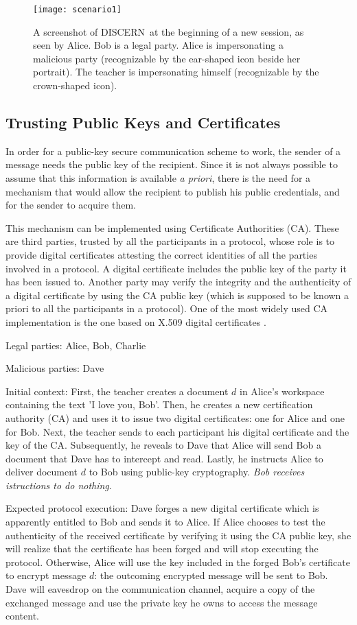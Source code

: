 \documentclass[conference]{IEEEtran}
\def\disgrace{DISCERN}
\begin{document}
\begin{figure*}
\centering
\texttt{[image: scenario1]}
\caption{A screenshot of \disgrace\ at the beginning of a new session, as seen by Alice. Bob is a legal party. Alice is impersonating a malicious party (recognizable by the ear-shaped icon beside her portrait). The teacher is impersonating himself (recognizable by the crown-shaped icon).}
\label{fig:scenario}
\end{figure*}

\subsection{ Trusting Public Keys and Certificates}
In order for a public-key secure communication scheme to work,
the sender of a message needs the public key of the recipient.
Since it is not always possible to assume that this information
is available {\em a priori}, there is the need for a mechanism
that would allow the recipient to publish his public credentials, and
for the sender to acquire them.

This mechanism can be implemented using Certificate Authorities (CA). These
are third parties, trusted by all the participants in a protocol, whose
role is to provide digital certificates attesting the correct
identities of all the parties involved in a protocol. A digital
certificate includes the public key of the party it has been issued
to. Another party may verify the integrity and the authenticity of a
digital certificate by using the CA public key (which is supposed to
be known a priori to all the participants in a protocol). One of the
most widely used CA implementation is the one based
on X.509 digital certificates \cite{x509}. 

{\sc Legal parties:} Alice, Bob, Charlie

{\sc Malicious parties:} Dave

{\sc Initial context:} First, the teacher creates a document $d$
in Alice's workspace containing the text 'I love you, Bob'.
Then, he creates a new certification authority (CA) and uses it to issue
two digital certificates: one for Alice and one for Bob. Next, the
teacher sends to each participant his digital certificate and the key
of the CA.  Subsequently, he reveals
to Dave that Alice will send Bob a document that Dave has to
intercept and read. Lastly, he instructs Alice to deliver
document $d$ to Bob using public-key cryptography. {\em Bob receives
istructions to do nothing}. 

{\sc Expected protocol execution:} Dave forges a new digital
certificate which is apparently entitled to Bob and sends it to
Alice. If Alice chooses to test the authenticity of the received
certificate by verifying it using the CA public key, she will realize
that the certificate has been forged and will stop executing the
protocol. Otherwise, Alice will use the key included in the forged
Bob's certificate to encrypt message $d$: the outcoming
encrypted message will be sent to Bob. Dave will eavesdrop on the
communication channel, acquire a copy of the exchanged message
and use the private key he owns to access the message content. 
\end{document}
